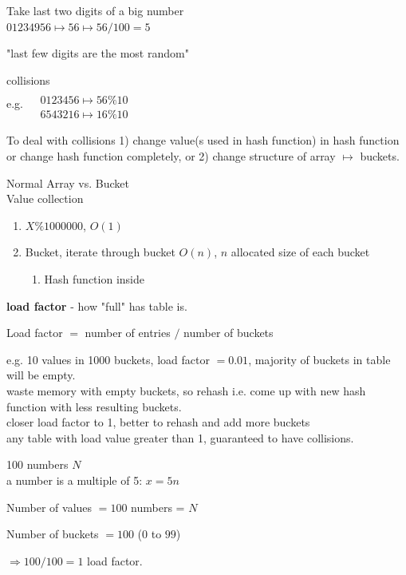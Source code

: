\documentclass[10pt]{amsart}
\begin{document}
\begin{multicols*}{2}
Take last two digits of a big number \\
$01234956 \mapsto 56 \mapsto 56/100 = 5$

"last few digits are the most random"

collisions \\
e.g. 
$\begin{aligned} 
& \quad \\ 
& 0123456 \mapsto 56 \% 10 \\
& 6543216 \mapsto 16 \% 10 \end{aligned}$ 

To deal with collisions
1) change value(s used in hash function) in hash function or change hash function completely, or 2) change structure of array $\mapsto $ buckets.

Normal Array vs. Bucket \\
Value \phantom{ Array vs. } collection \\

\begin{enumerate}
	\item $ X \% 1000000$, $O(1)$ 
	\item Bucket, iterate through bucket $O(n)$, $n$ allocated size of each bucket
	\begin{enumerate}
		\item  Hash function inside 
	\end{enumerate}
\end{enumerate}

\textbf{load factor} - how "full" has table is.

Load factor $=$ number of entries $/$ number of buckets 

e.g. 10 values in 1000 buckets, load factor $=0.01$, majority of buckets in table will be empty. \\
waste memory with empty buckets, so rehash i.e. come up with new hash function with less resulting buckets. \\

closer load factor to 1, better to rehash and add more buckets \\
any table with load value greater than 1, guaranteed to have collisions.

100 numbers $N$ \\
a number is a multiple of 5: $x = 5n$ 

Number of values $= 100$ numbers = $N$

Number of buckets $= 100$ ($0$ to $99$)

$\Longrightarrow 100/ 100 = 1$ load factor.


\end{multicols*}
\end{document}
